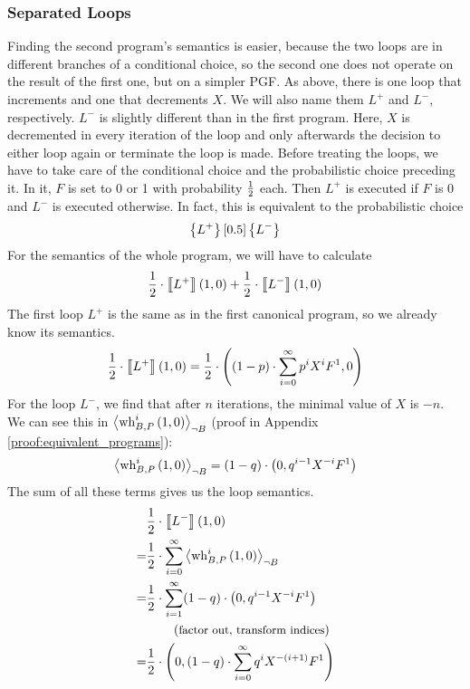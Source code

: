 \subsubsection*{Separated Loops}
Finding the second program's semantics is easier, because the two loops are in different branches of a conditional choice, so the second one does not operate on the result of the first one, but on a simpler PGF.
As above, there is one loop that increments and one that decrements $X$.
We will also name them $L^+$ and $L^-$, respectively.
$L^-$ is slightly different than in the first program.
Here, $X$ is decremented in every iteration of the loop and only afterwards the decision to either loop again or terminate the loop is made.
Before treating the loops, we have to take care of the conditional choice and the probabilistic choice preceding it.
In it, $F$ is set to 0 or 1 with probability $\frac{1}{2}$ each.
Then $L^+$ is executed if $F$ is 0 and $L^-$ is executed otherwise.
In fact, this is equivalent to the probabilistic choice
\[ \left\{ L^+ \right\} \left[ 0.5 \right] \left\{ L^- \right\} \]
For the semantics of the whole program, we will have to calculate
\begin{align*}
	\frac{1}{2} \cdot \left\llbracket L^+ \right\rrbracket\left( 1, 0 \right)
		+ \frac{1}{2} \cdot \left\llbracket L^- \right\rrbracket\left( 1, 0 \right)
\end{align*}
The first loop $L^+$ is the same as in the first canonical program, so we already know its semantics.
\[ \frac{1}{2} \cdot \left\llbracket L^+ \right\rrbracket\left( 1, 0 \right)
	= \frac{1}{2} \cdot \left( (1-p) \cdot \sum_{i=0}^{\infty} p^i X^i F^1, 0 \right) \]
For the loop $L^-$, we find that after $n$ iterations, the minimal value of $X$ is $-n$.
We can see this in $\left\langle \operatorname{wh}_{B, P}^i\left( 1, 0 \right) \right\rangle_{\lnot B}$ (proof in Appendix \ref{proof:equivalent_programs}):
\[ \left\langle \operatorname{wh}_{B, P}^i\left( 1, 0 \right) \right\rangle_{\lnot B} = (1-q) \cdot \left( 0, q^{i-1} X^{-i} F^1 \right) \]
The sum of all these terms gives us the loop semantics.
\begin{align*}
	 & \frac{1}{2} \cdot \left\llbracket L^- \right\rrbracket\left( 1, 0 \right) \\
	=& \frac{1}{2} \cdot \sum_{i=0}^{\infty} \left\langle  \operatorname{wh}_{B, P}^i \left( 1, 0 \right)  \right\rangle_{\lnot B} \\
	=& \frac{1}{2} \cdot \sum_{i=1}^{\infty} (1-q) \cdot \left( 0, q^{i-1} X^{-i} F^1 \right) \\
	 & \hspace*{2em} \left(\text{\small factor out, transform indices}\right) \\
	=& \frac{1}{2} \cdot \left( 0, (1-q) \cdot \sum_{i=0}^{\infty} q^i X^{-(i+1)} F^1 \right)
\end{align*}
